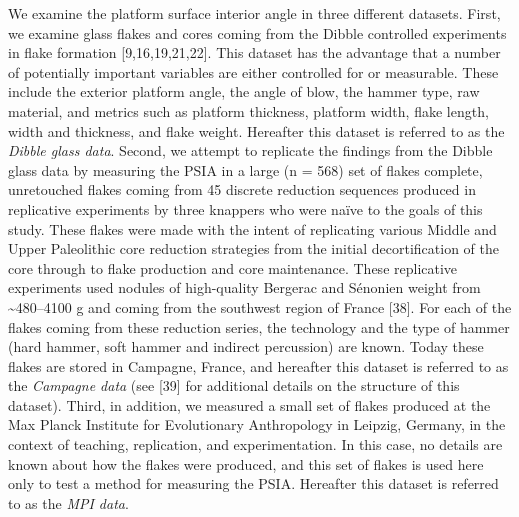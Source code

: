 \documentclass[10pt,letterpaper]{article}
\begin{document}
We examine the platform surface interior angle in three different
datasets. First, we examine glass flakes and cores coming from the
Dibble controlled experiments in flake formation {[}9,16,19,21,22{]}.
This dataset has the advantage that a number of potentially important
variables are either controlled for or measurable. These include the
exterior platform angle, the angle of blow, the hammer type, raw
material, and metrics such as platform thickness, platform width, flake
length, width and thickness, and flake weight. Hereafter this dataset is
referred to as the \emph{Dibble glass data}. Second, we attempt to
replicate the findings from the Dibble glass data by measuring the PSIA
in a large (n = 568) set of flakes complete, unretouched flakes coming
from 45 discrete reduction sequences produced in replicative experiments
by three knappers who were naïve to the goals of this study. These
flakes were made with the intent of replicating various Middle and Upper
Paleolithic core reduction strategies from the initial decortification
of the core through to flake production and core maintenance. These
replicative experiments used nodules of high-quality Bergerac and
Sénonien weight from \textasciitilde480--4100 g and coming from the
southwest region of France {[}38{]}. For each of the flakes coming from
these reduction series, the technology and the type of hammer (hard
hammer, soft hammer and indirect percussion) are known. Today these
flakes are stored in Campagne, France, and hereafter this dataset is
referred to as the \emph{Campagne data} (see {[}39{]} for additional
details on the structure of this dataset). Third, in addition, we
measured a small set of flakes produced at the Max Planck Institute for
Evolutionary Anthropology in Leipzig, Germany, in the context of
teaching, replication, and experimentation. In this case, no details are
known about how the flakes were produced, and this set of flakes is used
here only to test a method for measuring the PSIA. Hereafter this
dataset is referred to as the \emph{MPI data}.
\end{document}
